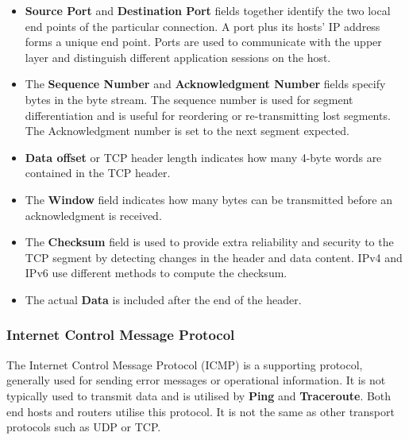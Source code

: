 \documentclass{article}
\begin{document}
\begin{itemize}
\item \textbf{Source Port} and \textbf{Destination Port} fields together identify the two local end points of the particular connection. A port plus its hosts' IP address forms a unique end point. Ports are used to communicate with the upper layer and distinguish different application sessions on the host.
\item The \textbf{Sequence Number} and \textbf{Acknowledgment Number} fields specify bytes in the byte stream. The sequence number is used for segment differentiation and is useful for reordering or re-transmitting lost segments. The Acknowledgment number is set to the next segment expected.
\item \textbf{Data offset} or TCP header length indicates how many 4-byte words are contained in the TCP header.
\item The \textbf{Window} field indicates how many bytes can be transmitted before an acknowledgment is received.
\item The \textbf{Checksum} field is used to provide extra reliability and security to the TCP segment by detecting changes in the header and data content. IPv4 and IPv6 use different methods to compute the checksum.
\item The actual \textbf{Data} is included after the end of the header. \\
\end{itemize}

\subsubsection{Internet Control Message Protocol}
The Internet Control Message Protocol (ICMP) is a supporting protocol, generally used for sending error messages or operational information. It is not typically used to transmit data and is utilised by \textbf{Ping} and \textbf{Traceroute}. Both end hosts and routers utilise this protocol. It is not the same as other transport protocols such as UDP or TCP. \\
\end{document}
